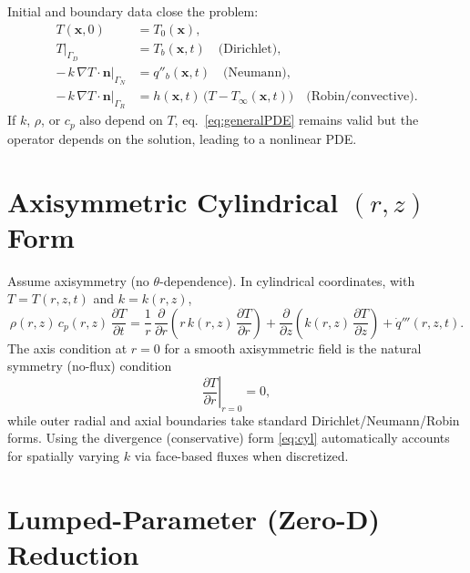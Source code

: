 \documentclass[11pt]{article}
\begin{document}
Initial and boundary data close the problem:
\begin{align}
T(\mathbf{x},0) &= T_0(\mathbf{x}), \\
T|_{\Gamma_D} &= T_b(\mathbf{x},t)\quad\text{(Dirichlet)},\\
-\,k\,\nabla T\cdot\mathbf{n}\big|_{\Gamma_N} &= q''_b(\mathbf{x},t)\quad\text{(Neumann)},\\
-\,k\,\nabla T\cdot\mathbf{n}\big|_{\Gamma_R} &= h(\mathbf{x},t)\,\big(T-T_\infty(\mathbf{x},t)\big) \quad\text{(Robin/convective)}.
\end{align}
If $k$, $\rho$, or $c_p$ also depend on $T$, eq.~\eqref{eq:generalPDE} remains valid but the operator depends on the solution, leading to a nonlinear PDE.

\section{Axisymmetric Cylindrical $(r,z)$ Form}

Assume axisymmetry (no $\theta$-dependence). In cylindrical coordinates, with $T=T(r,z,t)$ and $k=k(r,z)$,
\begin{equation}
\rho(r,z)\,c_p(r,z)\,\frac{\partial T}{\partial t}
= \frac{1}{r}\,\frac{\partial}{\partial r}\!\left( r\,k(r,z)\,\frac{\partial T}{\partial r} \right)
+ \frac{\partial}{\partial z}\!\left( k(r,z)\,\frac{\partial T}{\partial z} \right)
+ \dot{q}'''(r,z,t).
\label{eq:cyl}
\end{equation}
The axis condition at $r=0$ for a smooth axisymmetric field is the natural symmetry (no-flux) condition
\begin{equation}
\left.\frac{\partial T}{\partial r}\right|_{r=0}=0,
\label{eq:axisBC}
\end{equation}
while outer radial and axial boundaries take standard Dirichlet/Neumann/Robin forms. Using the divergence (conservative) form \eqref{eq:cyl} automatically accounts for spatially varying $k$ via face-based fluxes when discretized.

\section{Lumped-Parameter (Zero-D) Reduction}
\end{document}
